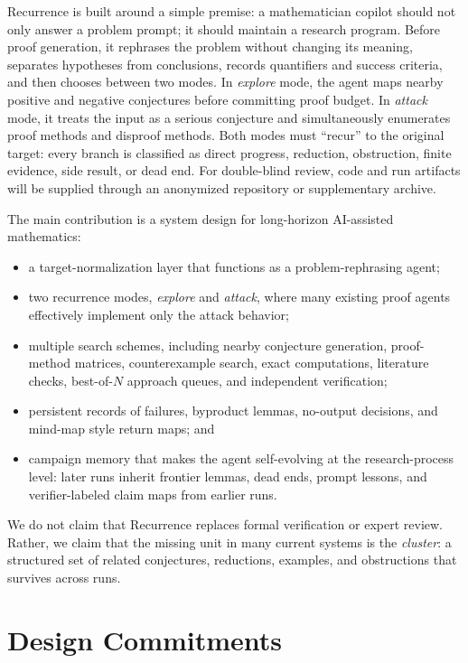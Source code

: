 \documentclass{article}
\theoremstyle{definition}
\theoremstyle{remark}
\begin{document}
Recurrence is built around a simple premise: a mathematician copilot should not only answer a problem prompt; it should maintain a research program. Before proof generation, it rephrases the problem without changing its meaning, separates hypotheses from conclusions, records quantifiers and success criteria, and then chooses between two modes. In \emph{explore} mode, the agent maps nearby positive and negative conjectures before committing proof budget. In \emph{attack} mode, it treats the input as a serious conjecture and simultaneously enumerates proof methods and disproof methods. Both modes must ``recur'' to the original target: every branch is classified as direct progress, reduction, obstruction, finite evidence, side result, or dead end. For double-blind review, code and run artifacts will be supplied through an anonymized repository or supplementary archive.

The main contribution is a system design for long-horizon AI-assisted mathematics:
\begin{itemize}
  \item a target-normalization layer that functions as a problem-rephrasing agent;
  \item two recurrence modes, \emph{explore} and \emph{attack}, where many existing proof agents effectively implement only the attack behavior;
  \item multiple search schemes, including nearby conjecture generation, proof-method matrices, counterexample search, exact computations, literature checks, best-of-$N$ approach queues, and independent verification;
  \item persistent records of failures, byproduct lemmas, no-output decisions, and mind-map style return maps; and
  \item campaign memory that makes the agent self-evolving at the research-process level: later runs inherit frontier lemmas, dead ends, prompt lessons, and verifier-labeled claim maps from earlier runs.
\end{itemize}

We do not claim that Recurrence replaces formal verification or expert review. Rather, we claim that the missing unit in many current systems is the \emph{cluster}: a structured set of related conjectures, reductions, examples, and obstructions that survives across runs.

\section{Design Commitments}
\end{document}
